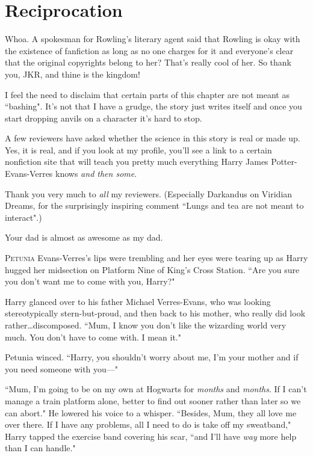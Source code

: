 \chapter{Reciprocation}

\begin{chapterOpeningAuthorNote}
Whoa. A spokesman for Rowling's literary agent said that Rowling is okay with the existence of fanfiction as long as no one charges for it and everyone's clear that the original copyrights belong to her? That's really cool of her. So thank you, JKR, and thine is the kingdom!

I feel the need to disclaim that certain parts of this chapter are not meant as ``bashing". It's not that I have a grudge, the story just writes itself and once you start dropping anvils on a character it's hard to stop.

A few reviewers have asked whether the science in this story is real or made up. Yes, it is real, and if you look at my profile, you'll see a link to a certain nonfiction site that will teach you pretty much everything Harry James Potter-Evans-Verres knows \emph{and then some}.

Thank you very much to \emph{all} my reviewers. (Especially Darkandus on Viridian Dreams, for the surprisingly inspiring comment ``Lungs and tea are not meant to interact".)
\end{chapterOpeningAuthorNote}
\begin{chapterOpeningQuote}
Your dad is almost as awesome as my dad.
\end{chapterOpeningQuote}

\lettrine{P}{etunia} Evans-Verres's lips were trembling and her eyes were tearing up as Harry hugged her midsection on Platform Nine of King's Cross Station. ``Are you sure you don't want me to come with you, Harry?"

Harry glanced over to his father Michael Verres-Evans, who was looking stereotypically stern-but-proud, and then back to his mother, who really did look rather…discomposed. ``Mum, I know you don't like the wizarding world very much. You don't have to come with. I mean it."

Petunia winced. ``Harry, you shouldn't worry about me, I'm your mother and if you need someone with you—"

``Mum, I'm going to be on my own at Hogwarts for \emph{months} and \emph{months}. If I can't manage a train platform alone, better to find out sooner rather than later so we can abort." He lowered his voice to a whisper. ``Besides, Mum, they all love me over there. If I have any problems, all I need to do is take off my sweatband," Harry tapped the exercise band covering his scar, ``and I'll have \emph{way} more help than I can handle."

